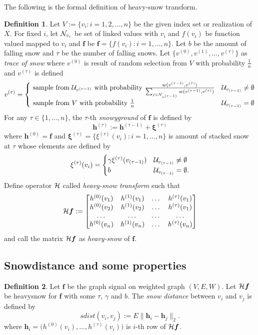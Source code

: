 \documentclass[preprint, review, 12pt]{article}
\theoremstyle{definition}
\newtheorem{dfn}{Definition}
\theoremstyle{remark}
\begin{document}
The following is the formal definition of heavy-snow transform.
\begin{dfn}\label{snow:df_hst}
Let $V:=\{v_i:i=1,2,\dots,n\}$ be the given index set or realization of $X$. For fixed $i$, let ${\cal N}_{v_i}$ be set of linked values with $v_i$ and $f(v_i)$ be function valued mapped to $v_i$ and $\boldsymbol f$ be ${\boldsymbol f}=\{f(v_i): i=1,\dots,n \}$. Let $b$ be the amount of falling snow and $\tau$ be the number of falling snows. Let $\{v^{(0)},v^{(1)},\dots,v^{(\tau)}\}$ as \emph{trace of snow} where $v^{(0)}$ is result of random selection from $V$ with probability $\frac{1}{n}$ and $v^{(\tau)}$ is defined
\[
v^{(\tau)}=\begin{cases}
\mbox{ sample from } {\cal U}_{v^{(\tau-1)}} \mbox{ with probability } \frac{w(v^{(\tau-1)},v^{(\tau)})}{\sum_{j \in {\cal N}_{v^{(\tau-1)}}}w(v^{(\tau-1)},v^{(\tau)})}  & {\cal U}_{v_{(\tau-1)}}\neq \emptyset \\ 
\mbox{ sample from } V \mbox{ with probability  } \frac{1}{n}  & {\cal U}_{v_{(\tau-1)}}= \emptyset 
\end{cases}
\]
For any $\tau \in \{1,\dots,n\}$, the $\tau$-th \emph{snowyground} of ${\boldsymbol f}$ is defined by 
\[
{\boldsymbol h}^{(\tau)} := {\boldsymbol h}^{(\tau-1)}+{\boldsymbol \xi}^{(\tau)}
\]
where ${\boldsymbol h}^{(0)}={\boldsymbol f}$ and ${\boldsymbol \xi}^{(\tau)}=\{\xi^{(\tau)}(v_i): i=1,\dots,n\}$ is amount of stacked snow at $\tau$ whose elements are defined by 
\[
\xi^{(\tau)}(v_i)=	\begin{cases}
\gamma \xi^{(\tau)}(v_{(\tau-1)})  & {\cal U}_{v_{(\tau-1)}}\neq \emptyset \\ 
b &  {\cal U}_{v_{(\tau-1)}} = \emptyset. \\ 
\end{cases}
\]
Define operator ${\cal H}$ called \emph{heavy-snow transform} such that
\[
{\cal H}{\boldsymbol f}:=\begin{bmatrix} 
h^{(0)}(v_1) & h^{(1)}(v_1) & \dots & h^{(\tau)}(v_1) \\ 
h^{(0)}(v_2) & h^{(1)}(v_2) & \dots & h^{(\tau)}(v_1) \\ 
\dots  & \dots & \dots & \dots \\ 
h^{(0)}(v_n) & h^{(1)}(v_n) & \dots & h^{(\tau)}(v_n) \end{bmatrix}
\]
and call the matrix ${\cal H}{\boldsymbol f}$ as \emph{heavy-snow} of ${\boldsymbol f}$. 
\end{dfn}

\subsection{Snowdistance and some properties} 
\begin{dfn}
Let ${\boldsymbol f}$ be the graph signal on weighted graph $(V,E,W)$. Let ${\cal H}{\boldsymbol f}$ be heavysnow for ${\boldsymbol f}$ with some $\tau$, $\gamma$ and $b$. The \emph{snow distance} between $v_i$ and $v_j$ is defined by 
\[
sdist(v_i , v_j) := E\|{\boldsymbol h}_i- {\boldsymbol h}_j\|_2.
\]
where ${\boldsymbol h}_i=\big(h^{(0)}(v_i),\dots,h^{(\tau)}(v_i)\big)$ is $i$-th row of ${\cal H}{\boldsymbol f}$.
\end{dfn}
\end{document}
